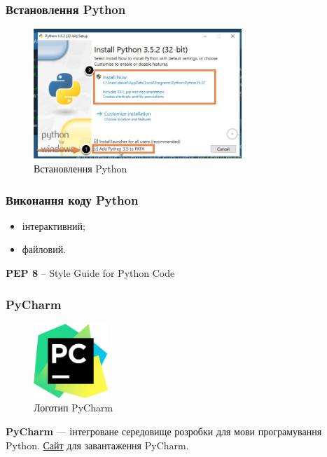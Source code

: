 \begin{frame}
\frametitle{Встановлення Python}
\begin{figure}
\begin{center}
 \includegraphics[width=0.7\textwidth]{pictures/python_install.jpg}
\caption{Встановлення Python}
\label{python_install} 
\end{center}
\end{figure}
\end{frame}

\begin{frame}
\frametitle{Виконання коду Python}
\begin{itemize}
  \item інтерактивний;
  \item файловий.
\end{itemize}
\textbf{PEP 8} – Style Guide for Python Code
\end{frame}

\begin{frame}
\frametitle{PyCharm}

\begin{figure}
\includegraphics[width=0.25\textwidth]{pictures/pycharm_logo.png}
\caption{Логотип PyCharm}
\label{pycharm_logo}
\end{figure}


\textbf{PyCharm} — інтегроване середовище розробки для мови програмування Python. \href{https://www.jetbrains.com/pycharm/download/}{Сайт} для завантаження PyCharm.
\end{frame}

